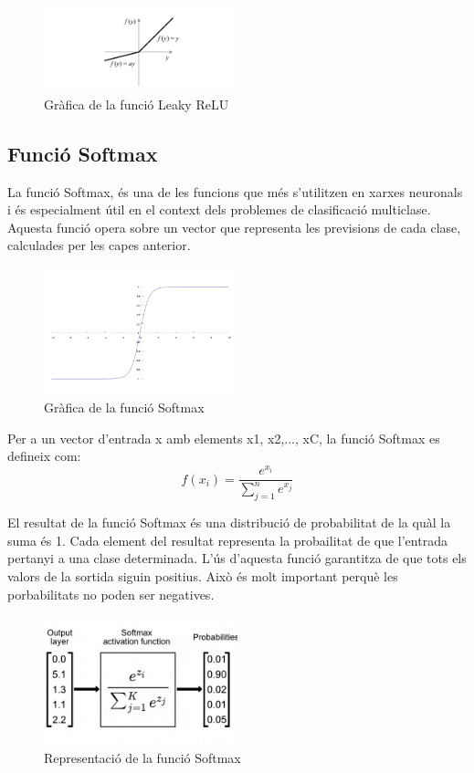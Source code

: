 {\begin{figure}[h!]
    \centering
    \includegraphics[width=0.5\textwidth]{./figures/leaky_ReLU.png}
    \caption{Gràfica de la funció Leaky ReLU}
\end{figure}

\subsection{Funció Softmax}
La funció Softmax, és una de les funcions que més s'utilitzen en xarxes neuronals i és especialment útil en el context dels problemes de clasificació multiclase. Aquesta funció opera sobre un vector que representa les previsions de cada clase, calculades per les capes anterior.

\begin{figure}[h!]
    \centering
    \includegraphics[width=0.5\textwidth]{./figures/Softmax.png}
    \caption{Gràfica de la funció Softmax}
\end{figure}

Per a un vector d'entrada x amb elements x1, x2,..., xC, la funció Softmax es defineix com:
\[f(x_i) = \frac{e^{x_i}}{\sum_{j=1}^{n} e^{x_j}}\]

El resultat de la funció Softmax és una distribució de probabilitat de la quàl la suma és 1. Cada element del resultat representa la probailitat de que l'entrada pertanyi a una clase determinada. L'ús d'aquesta funció garantitza de que tots els valors de la sortida siguin positius. Això és molt important perquè les porbabilitats no poden ser negatives.

\begin{figure}[H]
    \centering
    \includegraphics[width=0.5\textwidth]{./figures/representacio_Softmax.png}
    \caption{Representació de la funció Softmax}
\end{figure}

}
